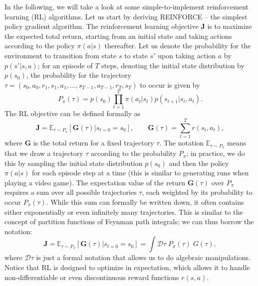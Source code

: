 In the following, we will take a look at some simple-to-implement reinforcement learning (RL) algorithms. Let us start by deriving REINFORCE -- the simplest policy gradient algorithm. The reinforcement learning objective $\mathbf{J}$ is to maximize the expected total return, starting from an initial state and taking actions according to the policy $\pi(a|s)$ thereafter. Let us denote the probability for the environment to transition from state $s$ to state $s'$ upon taking action $a$ by $p(s'|s,a)$; for an episode of $T$ steps, denoting the initial state distribution by $p(s_0)$, the probability for the trajectory $\tau = (s_0,a_0,r_1,s_1,a_1,\dots,s_{T-1},a_{T-1},r_T,s_T)$ to occur is given by
\begin{equation}
\label{eq:prob_trajs}
    P_\pi(\tau) = p(s_0)\prod_{t=1}^T \pi(a_t|s_t)p(s_{t+1}|s_t,a_t). 
\end{equation}
The RL objective can be defined formally as
\begin{equation}
\label{eq:RL_obj}
    \mathbf J = \mathbb{E}_{\tau\sim P_\pi} \left[ \mathbf G(\tau) | s_{t=0}=s_0 \right],\qquad \mathbf G(\tau)=\sum_{t=1}^T r(s_t,a_t),
\end{equation}
where $\mathbf G$ is the total return for a fixed trajectory $\tau$. The notation $\mathbb{E}_{\tau\sim P_\pi}$ means that we draw a trajectory $\tau$ according to the probability $P_\pi$; in practice, we do this by sampling the initial state distribution $p(s_0)$ and then the policy $\pi(a|s)$ for each episode step at a time (this is similar to generating runs when playing a video game). The expectation value of the return $\mathbf G(\tau)$ over $P_\pi$ requires a sum over all possible trajectories $\tau$, each weighted by its probability to occur $P_\pi(\tau)$. While this sum can formally be written down, it often contains either exponentially or even infinitely many trajectories. This is similar to the concept of partition functions of Feynman path integrals; we can thus borrow the notation:
\begin{equation}
    \mathbf J = \mathbb{E}_{\tau\sim P_\pi} \left[ \mathbf G(\tau) | s_{t=0}=s_0 \right]
    = \int\mathcal{D}\tau\; P_{\pi}(\tau)\; G(\tau),
\end{equation}
where $\mathcal{D}\tau$ is just a formal notation that allows us to do algebraic manipulations.
Notice that RL is designed to optimize in expectation, which allows it to handle non-differentiable or even discontinuous reward functions $r(s,a)$.  

